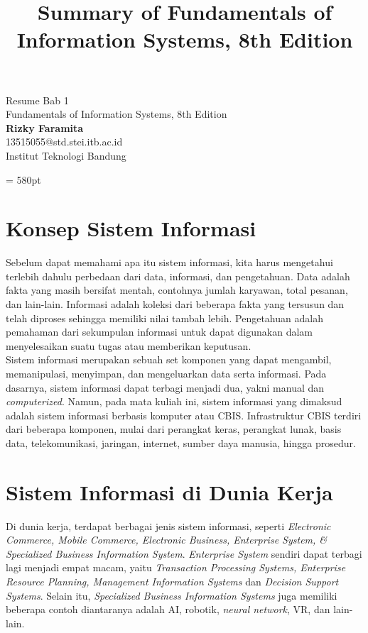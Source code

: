 \documentclass{article}
\title{Summary of Fundamentals of Information Systems, 8th  Edition}
\begin{document}
	\begin{center}
		\setcounter{page}{1}
		{\mdseries\Large Resume Bab 1}\\[4.5pt]
		{\mdseries\large Fundamentals of Information Systems, 8th  Edition}\\[1cm]
		\textbf{Rizky Faramita}\\[1pt]
		13515055@std.stei.itb.ac.id\\[1pt]
		Institut Teknologi Bandung\\[5pt]
	\end{center}
	\noindent
	\textwidth = 580pt

\section{Konsep Sistem Informasi}
Sebelum dapat memahami apa itu sistem informasi, kita harus mengetahui terlebih dahulu perbedaan dari data, informasi, dan pengetahuan. Data adalah fakta yang masih bersifat mentah, contohnya jumlah karyawan, total pesanan, dan lain-lain. Informasi adalah koleksi dari beberapa fakta yang tersusun dan telah diproses sehingga memiliki nilai tambah lebih. Pengetahuan adalah pemahaman dari sekumpulan informasi untuk dapat digunakan dalam menyelesaikan suatu tugas atau memberikan keputusan.\\

\noindent Sistem informasi merupakan sebuah set komponen yang dapat mengambil, memanipulasi, menyimpan, dan mengeluarkan data serta informasi. Pada dasarnya, sistem informasi dapat terbagi menjadi dua, yakni manual dan \emph{computerized}. Namun, pada mata kuliah ini, sistem informasi yang dimaksud adalah sistem informasi berbasis komputer atau CBIS. Infrastruktur CBIS terdiri dari beberapa komponen, mulai dari perangkat keras, perangkat lunak, basis data, telekomunikasi, jaringan, internet, sumber daya manusia, hingga prosedur.


\section{Sistem Informasi di Dunia Kerja}
Di dunia kerja, terdapat berbagai jenis sistem informasi, seperti \emph{Electronic Commerce, Mobile Commerce, Electronic Business, Enterprise System, \& Specialized Business Information System}. \emph{Enterprise System} sendiri dapat terbagi lagi menjadi empat macam, yaitu \emph{Transaction Processing Systems, Enterprise Resource Planning, Management Information Systems} dan \emph{Decision Support Systems}. Selain itu, \emph{Specialized Business Information Systems} juga memiliki beberapa contoh diantaranya adalah AI, robotik, \emph{neural network}, VR, dan lain-lain.\\
\end{document}
